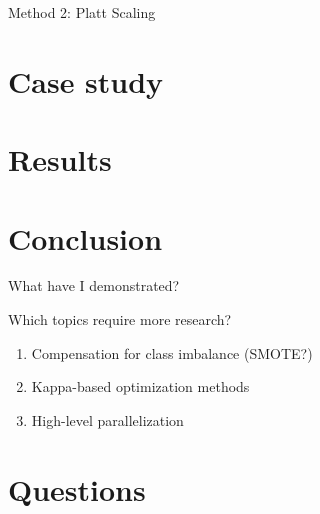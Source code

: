 \documentclass[ignorenonframetext,]{beamer}
\providecommand{\tightlist}{%
\setlength{\itemsep}{0pt}\setlength{\parskip}{0pt}}
\begin{document}
\begin{frame}{Method 2: Platt Scaling}

\end{frame}

\section{Case study}\label{case-study}

\section{Results}\label{results}

\section{Conclusion}\label{conclusion}

\begin{frame}{What have I demonstrated?}

\end{frame}

\begin{frame}{Which topics require more research?}

\begin{enumerate}
\def\labelenumi{\arabic{enumi}.}
\tightlist
\item
  Compensation for class imbalance (SMOTE?)
\item
  Kappa-based optimization methods
\item
  High-level parallelization
\end{enumerate}

\end{frame}

\section{Questions}\label{questions}
\end{document}

